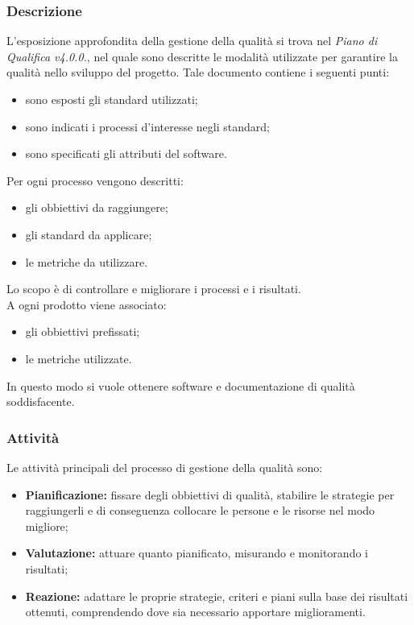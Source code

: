 \subsubsection{Descrizione}
L'esposizione approfondita della gestione della qualità si trova nel \textit{Piano di Qualifica v4.0.0.}, nel quale sono descritte le modalità utilizzate per garantire la qualità nello sviluppo del progetto. Tale documento contiene i seguenti punti:
\begin{itemize}
    \item sono esposti gli standard utilizzati;
    \item sono indicati i processi d'interesse negli standard;
    \item sono specificati gli attributi del software.
\end{itemize}
Per ogni processo vengono descritti:
\begin{itemize}
    \item gli obbiettivi da raggiungere;
    \item gli standard da applicare;
    \item le metriche da utilizzare.
\end{itemize}
Lo scopo è di controllare e migliorare i processi e i risultati. \\
A ogni prodotto viene associato:
\begin{itemize}
    \item gli obbiettivi prefissati;
    \item le metriche utilizzate.
\end{itemize}
In questo modo si vuole ottenere software e documentazione di qualità soddisfacente.
\subsubsection{Attività}
Le attività principali del processo di gestione della qualità sono:
\begin{itemize}
    \item \textbf{Pianificazione:} fissare degli obbiettivi di qualità, stabilire le strategie per raggiungerli e di conseguenza collocare le persone e le risorse nel modo migliore;
    \item \textbf{Valutazione:} attuare quanto pianificato, misurando e monitorando i risultati;
    \item \textbf{Reazione:} adattare le proprie strategie, criteri e piani sulla base dei risultati ottenuti, comprendendo dove sia necessario apportare miglioramenti.
\end{itemize}
